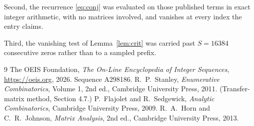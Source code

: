 \documentclass[11pt,a4paper]{article}
\theoremstyle{plain}
\theoremstyle{definition}
\begin{document}
Second, the recurrence \eqref{eq:conj} was evaluated on those published terms in exact
integer arithmetic, with no matrices involved, and vanishes at every index the entry claims.

Third, the vanishing test of Lemma~\ref{lem:crit} was carried past $S=16384$ consecutive
zeros rather than to a sampled prefix.

\begin{thebibliography}{9}
 The OEIS Foundation, \emph{The On-Line Encyclopedia of Integer
Sequences}, \url{https://oeis.org}, 2026. Sequence A298186.
 R.~P.~Stanley, \emph{Enumerative Combinatorics}, Volume 1, 2nd ed.,
Cambridge University Press, 2011. (Transfer-matrix method, Section 4.7.)
 P.~Flajolet and R.~Sedgewick, \emph{Analytic Combinatorics}, Cambridge
University Press, 2009.
 R.~A.~Horn and C.~R.~Johnson, \emph{Matrix Analysis}, 2nd ed., Cambridge
University Press, 2013.
\end{thebibliography}
\end{document}
